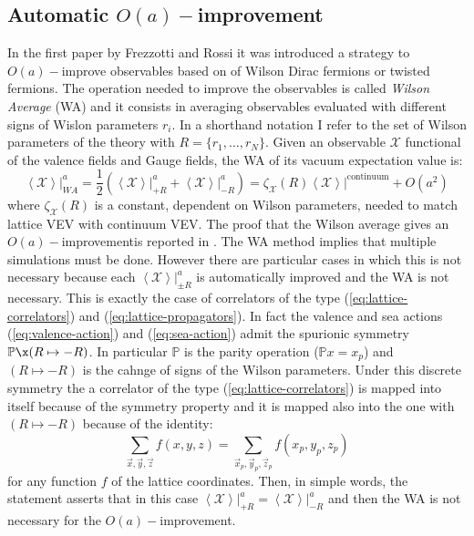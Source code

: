 \documentclass[english, LaM, oneside, noexaminfo]{sapthesis}
\newcommand{\la}{\langle}
\newcommand{\ra}{\rangle}
\newcommand{\oait}{$O(a)-$improvement}
\begin{document}
\subsection{Automatic \oait}
\noindent
In the first paper by Frezzotti and Rossi \cite{FR1} it was introduced a strategy to $O(a)-$improve observables based on of Wilson Dirac fermions or twisted fermions.
The operation needed to improve the observables is called \textit{Wilson Average} (WA) and it consists in averaging observables evaluated with different signs of Wislon parameters $r_i$.
In a shorthand notation I refer to the set of Wilson parameters of the theory with $R = \{r_1,\dots,r_N\}$.
\newline
Given an observable $\mathcal{X}$ functional of the valence fields and Gauge fields, the WA of its vacuum expectation value is:
\begin{equation*}
    \left\la \mathcal{X} \right\ra\Big|_{WA}^a = \frac{1}{2}\left( \left\la \mathcal{X} \right\ra\Big|_{+R}^a + \left\la \mathcal{X} \right\ra\Big|_{-R}^a\right) 
    = \zeta_\mathcal{X}(R)  \left\la \mathcal{X} \right\ra\Big|^\text{continuum} + O(a^2)
\end{equation*}
where $\zeta_\mathcal{X}(R)$ is a constant, dependent on Wilson parameters, needed to match lattice VEV with continuum VEV.
The proof that the Wilson average gives an \oait\space is reported in \cite{FR1}. 
\newline
The WA method implies that multiple simulations must be done.
However there are particular cases in which this is not necessary because each $\left\la \mathcal{X} \right\ra\big|_{\pm R}^a$ is automatically improved and the WA is not necessary.
This is exactly the case of correlators of the type (\ref{eq:lattice-correlators}) and (\ref{eq:lattice-propagators}).
In fact the valence and sea actions (\ref{eq:valence-action}) and (\ref{eq:sea-action}) admit the spurionic symmetry $\mathbb{P}\x (R\mapsto -R)$.
In particular $\mathbb{P}$ is the parity operation ($\mathbb{P}x = x_p$) and $(R\mapsto -R)$ is the cahnge of signs of the Wilson parameters.
Under this discrete symmetry the a correlator of the type (\ref{eq:lattice-correlators}) is mapped into itself because of the symmetry property and it is mapped also into the one with $(R\mapsto -R)$ because of the identity:
\begin{equation*}
    \sum_{\vec x, \vec y, \vec z} f(x,y,z) =  \sum_{\vec x_p, \vec y_p, \vec z_p} f(x_p,y_p,z_p)
\end{equation*}
for any function $f$ of the lattice coordinates.
Then, in simple words, the statement asserts that in this case $\left\la \mathcal{X} \right\ra\big|_{+R}^a = \left\la \mathcal{X} \right\ra\big|_{-R}^a$ and then the WA is not necessary for the \oait.
\end{document}
